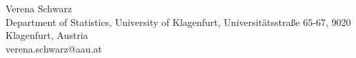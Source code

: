 \documentclass[11pt,a4paper]{article}
\numberwithin{equation}{section}
\theoremstyle{definition}
\begin{document}
\vspace{2em}
\centerline{\underline{\hspace*{16cm}}}

\noindent Verena Schwarz \Letter \\
Department of Statistics, University of Klagenfurt, Universit\"atsstra\ss{}e 65-67, 9020 Klagenfurt, Austria\\
verena.schwarz@aau.at\\
\end{document}
